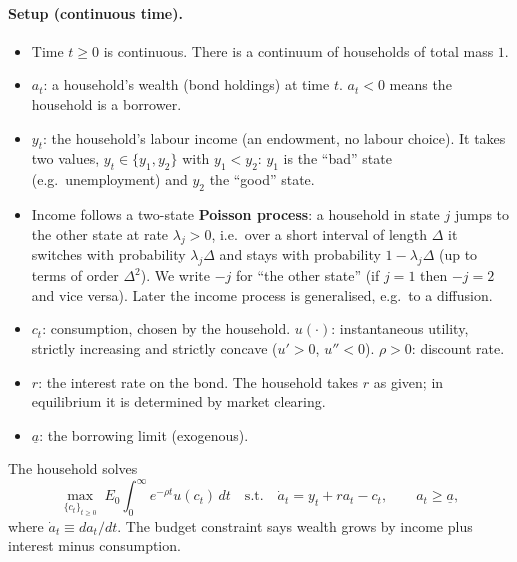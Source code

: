 \paragraph{Setup (continuous time).}
\begin{itemize}
  \item Time $t\ge0$ is continuous. There is a continuum of households of total mass $1$.
  \item $a_t$: a household's wealth (bond holdings) at time $t$. $a_t<0$ means the household is a borrower.
  \item $y_t$: the household's labour income (an endowment, no labour choice). It takes two values, $y_t\in\{y_1,y_2\}$ with $y_1<y_2$: $y_1$ is the ``bad'' state (e.g.\ unemployment) and $y_2$ the ``good'' state.
  \item Income follows a two-state \textbf{Poisson process}: a household in state $j$ jumps to the other state at rate $\lambda_j>0$, i.e.\ over a short interval of length $\Delta$ it switches with probability $\lambda_j\Delta$ and stays with probability $1-\lambda_j\Delta$ (up to terms of order $\Delta^2$). We write $-j$ for ``the other state'' (if $j=1$ then $-j=2$ and vice versa). Later the income process is generalised, e.g.\ to a diffusion.
  \item $c_t$: consumption, chosen by the household. $u(\cdot)$: instantaneous utility, strictly increasing and strictly concave ($u'>0$, $u''<0$). $\rho>0$: discount rate.
  \item $r$: the interest rate on the bond. The household takes $r$ as given; in equilibrium it is determined by market clearing.
  \item $\underline a$: the borrowing limit (exogenous).
\end{itemize}

The household solves
\begin{equation}\label{eq:hug-problem}
  \max_{\{c_t\}_{t\ge0}} \; E_0\!\int_0^\infty e^{-\rho t}u(c_t)\,dt
  \quad\text{s.t.}\quad
  \dot a_t = y_t + r a_t - c_t,\qquad a_t\ge \underline a ,
\end{equation}
where $\dot a_t\equiv da_t/dt$. The budget constraint says wealth grows by income plus interest minus consumption.

